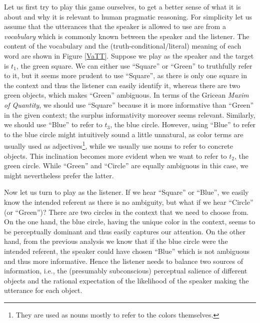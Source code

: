 Let us first try to play this game ourselves, to get a better sense of
what it is about and why it is relevant to human pragmatic
reasoning. For simplicity let us assume that the utterances that the
speaker is allowed to use are from a \emph{vocabulary} which is
commonly known between the speaker and the listener. The content of
the vocabulary and the (truth-conditional/literal) meaning of each
word are shown in Figure \ref{VaTT}. Suppose we play as the speaker
and the target is $t_1$, the green square. We can either use
``Square'' or ``Green'' to truthfully refer to it, but it seems more
prudent to use ``Square'', as there is only one square in the context
and thus the listener can easily identify it, whereas there are two
green objects, which makes ``Green'' ambiguous. In terms of the
Gricean \emph{Maxim of Quantity}, we should use ``Square'' because it
is more informative than ``Green'' in the given context; the surplus
informativity moreover seems relevant. Similarly, we should use
``Blue'' to refer to $t_3$, the blue circle. However, using ``Blue''
to refer to the blue circle might intuitively sound a little
unnatural, as color terms are usually used as adjectives\footnote{They
  are used as nouns mostly to refer to the colors themselves.}, while
we usually use nouns to refer to concrete objects. This inclination
becomes more evident when we want to refer to $t_2$, the green
circle. While ``Green'' and ``Circle'' are equally ambiguous in this
case, we might nevertheless prefer the latter.

Now let us turn to play as the listener. If we hear ``Square'' or
``Blue'', we easily know the intended referent as there is no
ambiguity, but what if we hear ``Circle'' (or ``Green'')? There are
two circles in the context that we need to choose from. On the one
hand, the blue circle, having the unique color in the context, seems
to be perceptually dominant and thus easily captures our attention. On
the other hand, from the previous analysis we know that if the blue
circle were the intended referent, the speaker could have chosen
``Blue'' which is not ambiguous and thus more informative. Hence the
listener needs to balance two sources of information, i.e., the
(presumably subconscious) perceptual salience of different objects and
the rational expectation of the likelihood of the speaker making the
utterance for each object. 

